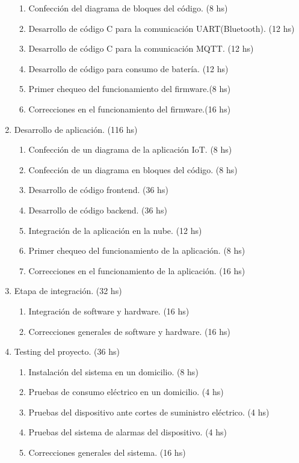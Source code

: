 \documentclass[
11pt, %
]{charter}
\begin{document}
\begin{enumerate}
\begin{enumerate}
	\item Confección del diagrama de bloques del código. (8 hs)
	\item Desarrollo de código C para la comunicación UART(Bluetooth). (12 hs)
	\item Desarrollo de código C para la comunicación MQTT.	(12 hs)
	\item Desarrollo de código para consumo de batería.	(12 hs)
	\item Primer chequeo del funcionamiento del firmware.(8 hs)
	\item Correcciones en el funcionamiento del firmware.(16 hs)
	\end{enumerate}
\item Desarrollo de aplicación. (116 hs)
	\begin{enumerate}
	\item Confección de un diagrama de la aplicación IoT. (8 hs)
	\item Confección de un diagrama en bloques del código. (8 hs)
	\item Desarrollo de código frontend. (36 hs)
	\item Desarrollo de código backend. (36 hs)
	\item Integración de la aplicación en la nube. (12 hs)
	\item Primer chequeo del funcionamiento de la  aplicación. (8 hs)
	\item Correcciones en el funcionamiento de la  aplicación. (16 hs)
	\end{enumerate}

\item Etapa de integración. (32 hs)
	\begin{enumerate}
	\item Integración de software y  hardware. (16 hs)
	\item Correcciones generales de software y  hardware. (16 hs)
	\end{enumerate}
	
\item Testing del proyecto. (36 hs)
	\begin{enumerate}
	\item Instalación del sistema en un domicilio. (8 hs)
	\item Pruebas de consumo eléctrico en un domicilio.	(4 hs)
	\item Pruebas del dispositivo ante cortes de suministro eléctrico.	(4 hs)
	\item Pruebas del sistema de alarmas del dispositivo. (4 hs)
	\item Correcciones generales del sistema. (16 hs)
	\end{enumerate}
	

\end{enumerate}
\end{document}
